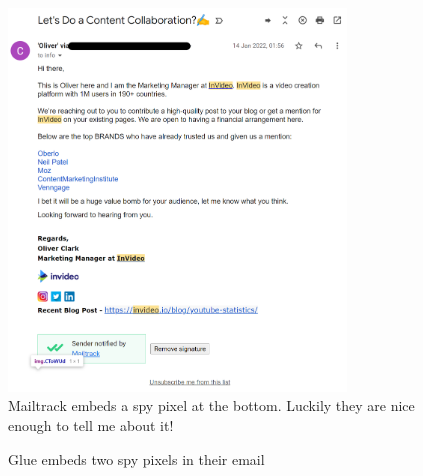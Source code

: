 \documentclass{article}
\begin{document}
\begin{figure}[H]
\centering
\includegraphics[width=0.8\textwidth]{images/oliver.png}
\caption{\label{oliver}Mailtrack embeds a spy pixel at the bottom. Luckily they are nice enough to tell me about it!}
\end{figure}

\begin{figure}[H]
    \centering
    \qquad
    \caption{Glue embeds two spy pixels in their email}
\end{figure}
\end{document}
